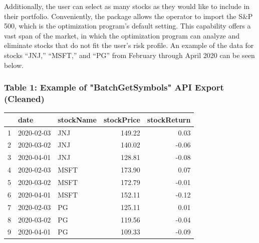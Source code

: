 \documentclass[12pt,english]{article}
\begin{document}
\begin{doublespace}
        Additionally, the user can select as many stocks as they would like to include in their portfolio. Conveniently, the package allows the operator to import the S&P 500, which is the optimization program’s default setting. This capability offers a vast span of the market, in which the optimization program can analyze and eliminate stocks that do not fit the user’s risk profile. An example of the data for stocks “JNJ,” “MSFT,” and “PG” from February through April 2020 can be seen below.
        
        \subsubsection{Table 1: Example of "BatchGetSymbols" API Export (Cleaned)}        
            \begin{center}
                \begin{table}[ht]
                \centering
                \begin{tabular}{rllrr}
                  \hline
                 & date & stockName & stockPrice & stockReturn \\ 
                  \hline
                1 & 2020-02-03 & JNJ & 149.22 & 0.03 \\ 
                  2 & 2020-03-02 & JNJ & 140.02 & -0.06 \\ 
                  3 & 2020-04-01 & JNJ & 128.81 & -0.08 \\ 
                  4 & 2020-02-03 & MSFT & 173.90 & 0.07 \\ 
                  5 & 2020-03-02 & MSFT & 172.79 & -0.01 \\ 
                  6 & 2020-04-01 & MSFT & 152.11 & -0.12 \\ 
                  7 & 2020-02-03 & PG & 125.11 & 0.01 \\ 
                  8 & 2020-03-02 & PG & 119.56 & -0.04 \\ 
                  9 & 2020-04-01 & PG & 109.33 & -0.09 \\ 
                   \hline
                \end{tabular}
                \end{table}
            \end{center}
        

\end{doublespace}
\end{document}
